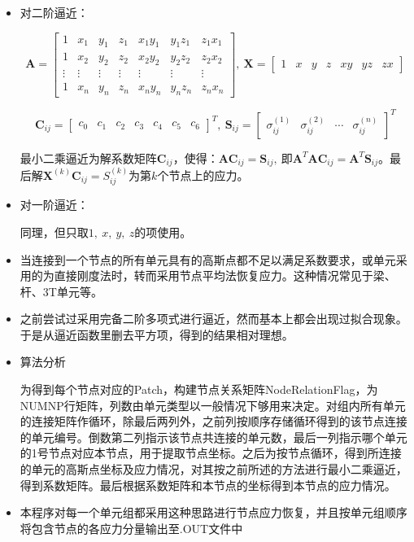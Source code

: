 \documentclass[UTF8]{ctexbook}
\begin{document}
\begin{itemize}
\item 对二阶逼近：


\[
\boldsymbol{A}=\begin{bmatrix}1 & x_{1} & y_{1} & z_{1} & x_{1}y_{1} & y_{1}z_{1} & z_{1}x_{1}\\
1 & x_{2} & y_{2} & z_{2} & x_{2}y_{2} & y_{2}z_{2} & z_{2}x_{2}\\
\vdots & \vdots & \vdots & \vdots & \vdots & \vdots & \vdots\\
1 & x_{n} & y_{n} & z_{n} & x_{n}y_{n} & y_{n}z_{n} & z_{n}x_{n}
\end{bmatrix},\ \boldsymbol{X}=\begin{bmatrix}1 & x & y & z & xy & yz & zx\end{bmatrix}
\]



\[
\boldsymbol{C}_{ij}=\begin{bmatrix}c_{0} & c_{1} & c_{2} & c_{3} & c_{4} & c_{5} & c_{6}\end{bmatrix}^{T},\ \boldsymbol{S}_{ij}=\begin{bmatrix}\sigma_{ij}^{(1)} & \sigma_{ij}^{(2)} & \cdots & \sigma_{ij}^{(n)}\end{bmatrix}^{T}
\]



最小二乘逼近为解系数矩阵$\boldsymbol{C}_{ij}$，使得：$\boldsymbol{AC}_{ij}=\boldsymbol{S}_{ij},\ \text{即}\boldsymbol{A}^{T}\boldsymbol{AC}_{ij}=\boldsymbol{A}^{T}\boldsymbol{S}_{ij}$。最后解$\boldsymbol{X}^{(k)}\boldsymbol{C}_{ij}=S_{ij}^{(k)}$为第$k$个节点上的应力。

\item 对一阶逼近：


同理，但只取$1,\ x,\ y,\ z$的项使用。

\item 当连接到一个节点的所有单元具有的高斯点都不足以满足系数要求，或单元采用的为直接刚度法时，转而采用节点平均法恢复应力。这种情况常见于梁、杆、3T单元等。
\item 之前尝试过采用完备二阶多项式进行逼近，然而基本上都会出现过拟合现象。于是从逼近函数里删去平方项，得到的结果相对理想。
\item 算法分析

为得到每个节点对应的Patch，构建节点关系矩阵NodeRelationFlag，为NUMNP行矩阵，列数由单元类型以一般情况下够用来决定。对组内所有单元的连接矩阵作循环，除最后两列外，之前列按顺序存储循环得到的该节点连接的单元编号。倒数第二列指示该节点共连接的单元数，最后一列指示哪个单元的1号节点对应本节点，用于提取节点坐标。之后为按节点循环，得到所连接的单元的高斯点坐标及应力情况，对其按之前所述的方法进行最小二乘逼近，得到系数矩阵。最后根据系数矩阵和本节点的坐标得到本节点的应力情况。

\item 本程序对每一个单元组都采用这种思路进行节点应力恢复，并且按单元组顺序将包含节点的各应力分量输出至.OUT文件中
\end{itemize}
\end{document}
